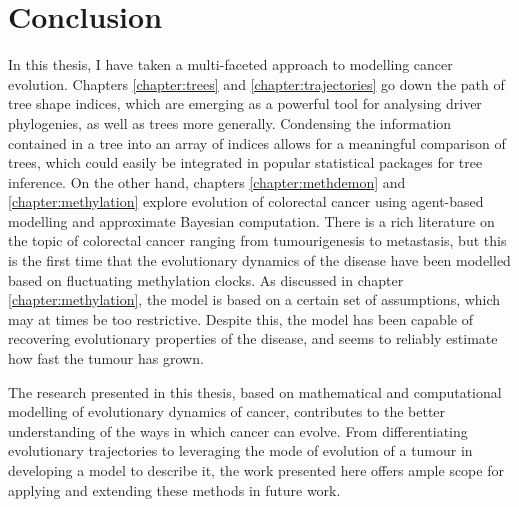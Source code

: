 \section{Conclusion}
In this thesis, I have taken a multi-faceted approach to modelling cancer
evolution. Chapters \ref{chapter:trees} and \ref{chapter:trajectories} go down
the path of tree shape indices, which are emerging as a powerful tool for
analysing driver phylogenies, as well as trees more generally. Condensing the
information contained in a tree into an array of indices allows for a meaningful
comparison of trees, which could easily be integrated in popular statistical
packages for tree inference. On the other hand, chapters \ref{chapter:methdemon}
and \ref{chapter:methylation} explore evolution of colorectal cancer using
agent-based modelling and approximate Bayesian computation. There is a rich
literature on the topic of colorectal cancer ranging from tumourigenesis to
metastasis, but this is the first time that the evolutionary dynamics of the
disease have been modelled based on fluctuating methylation clocks. As discussed
in chapter \ref{chapter:methylation}, the model is based on a certain set of
assumptions, which may at times be too restrictive. Despite this, the model
has been capable of recovering evolutionary properties of the disease, and seems
to reliably estimate how fast the tumour has grown. \par
The research presented in this thesis, based on mathematical and computational
modelling of evolutionary dynamics of cancer, contributes to the better
understanding of the ways in which cancer can evolve. From differentiating
evolutionary trajectories to leveraging the mode of evolution of a tumour in
developing a model to describe it, the work presented here offers ample scope
for applying and extending these methods in future work.

